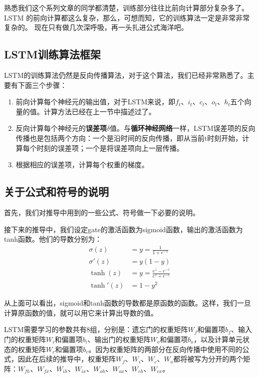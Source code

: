 熟悉我们这个系列文章的同学都清楚，训练部分往往比前向计算部分复杂多了。
{LSTM} 的前向计算都这么复杂，那么，可想而知，它的训练算法一定是非常非常复杂的。
现在只有做几次深呼吸，再一头扎进公式海洋吧。

\subsection{LSTM训练算法框架}\label{Lstm:4}

LSTM的训练算法仍然是反向传播算法，对于这个算法，我们已经非常熟悉了。主要有下面三个步骤：

\begin{enumerate}
	\item
	      前向计算每个神经元的输出值，对于LSTM来说，即\({f}_t\)、\({i}_t\)、\({c}_t\)、\({o}_t\)、\({h}_t\)五个向量的值。计算方法已经在上一节中描述过了。
	\item
	      反向计算每个神经元的\textbf{误差项}\(\delta\)值。与\textbf{循环神经网络}一样，LSTM误差项的反向传播也是包括两个方向：一个是沿时间的反向传播，即从当前t时刻开始，计算每个时刻的误差项；一个是将误差项向上一层传播。
	\item
	      根据相应的误差项，计算每个权重的梯度。
\end{enumerate}


\subsection{关于公式和符号的说明}\label{Lstm:5}

首先，我们对推导中用到的一些公式、符号做一下必要的说明。

接下来的推导中，我们设定gate的激活函数为sigmoid函数，输出的激活函数为tanh函数。他们的导数分别为：
\begin{align*}
	\sigma(z)  & =y=\frac{1}{1+e^{-z}}            \\
	\sigma'(z) & =y(1-y)                          \\
	\tanh(z)   & =y=\frac{e^z-e^{-z}}{e^z+e^{-z}} \\
	\tanh'(z)  & =1-y^2
\end{align*}

从上面可以看出，sigmoid和tanh函数的导数都是原函数的函数。这样，我们一旦计算原函数的值，就可以用它来计算出导数的值。

LSTM需要学习的参数共有8组，分别是：遗忘门的权重矩阵\(W_f\)和偏置项\({b}_f\)、输入门的权重矩阵\(W_i\)和偏置项\({b}_i\)、输出门的权重矩阵\(W_o\)和偏置项\({b}_o\)，以及计算单元状态的权重矩阵\(W_c\)和偏置项\({b}_c\)。因为权重矩阵的两部分在反向传播中使用不同的公式，因此在后续的推导中，权重矩阵\(W_f\)、\(W_i\)、\(W_c\)、\(W_o\)都将被写为分开的两个矩阵：\(W_{fh}\)、\(W_{fx}\)、\(W_{ih}\)、\(W_{ix}\)、\(W_{oh}\)、\(W_{ox}\)、\(W_{ch}\)、\(W_{cx}\)。

